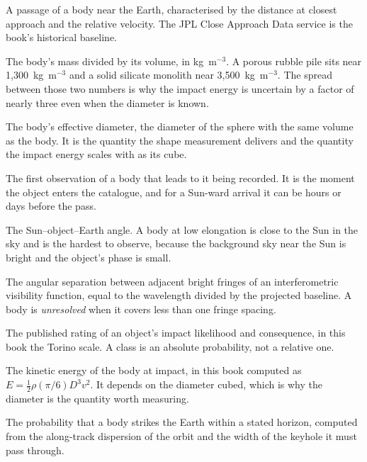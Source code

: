 \begin{description}[style=nextline,leftmargin=1.1em,labelindent=0pt,
  font=\normalfont\ttfamily\color{accent},itemsep=3pt,parsep=0pt]
\item[Close approach] A passage of a body near the Earth, characterised by
the distance at closest approach and the relative velocity. The JPL Close
Approach Data service is the book's historical baseline.

\item[Density \(\rho\)] The body's mass divided by its volume, in
kg~m\(^{-3}\). A porous rubble pile sits near 1,300~kg~m\(^{-3}\) and a
solid silicate monolith near 3,500~kg~m\(^{-3}\). The spread between those
two numbers is why the impact energy is uncertain by a factor of nearly
three even when the diameter is known.

\item[Diameter \(D\)] The body's effective diameter, the diameter of the
sphere with the same volume as the body. It is the quantity the shape
measurement delivers and the quantity the impact energy scales with as its
cube.

\item[Discovery] The first observation of a body that leads to it being
recorded. It is the moment the object enters the catalogue, and for a
Sun-ward arrival it can be hours or days before the pass.

\item[Elongation] The Sun--object--Earth angle. A body at low elongation is
close to the Sun in the sky and is the hardest to observe, because the
background sky near the Sun is bright and the object's phase is small.

\item[Fringe spacing] The angular separation between adjacent bright
fringes of an interferometric visibility function, equal to the wavelength
divided by the projected baseline. A body is \emph{unresolved} when it
covers less than one fringe spacing.

\item[Hazard class] The published rating of an object's impact likelihood and
consequence, in this book the Torino scale. A class is an absolute
probability, not a relative one.

\item[Impact energy] The kinetic energy of the body at impact, in this book
computed as \(E = \tfrac{1}{2}\rho (\pi/6) D^{3} v^{2}\). It depends on the
diameter cubed, which is why the diameter is the quantity worth measuring.

\item[Impact probability] The probability that a body strikes the Earth
within a stated horizon, computed from the along-track dispersion of the
orbit and the width of the keyhole it must pass through.


\end{description}
